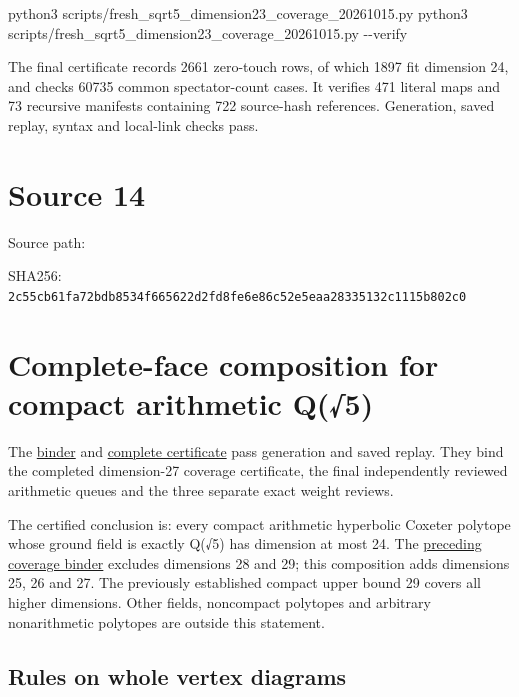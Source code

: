 \documentclass[
  10pt,
]{report}
\newenvironment{Shaded}{}{}
\newcommand{\AttributeTok}[1]{\textcolor[rgb]{0.49,0.56,0.16}{#1}}
\newcommand{\ExtensionTok}[1]{#1}
\newcommand{\NormalTok}[1]{#1}
\begin{document}
\begin{Shaded}
\begin{Highlighting}[]
\ExtensionTok{python3}\NormalTok{ scripts/fresh\_sqrt5\_dimension23\_coverage\_20261015.py}
\ExtensionTok{python3}\NormalTok{ scripts/fresh\_sqrt5\_dimension23\_coverage\_20261015.py }\AttributeTok{{-}{-}verify}
\end{Highlighting}
\end{Shaded}

The final certificate records 2661 zero-touch rows, of which 1897 fit
dimension 24, and checks 60735 common spectator-count cases. It verifies
471 literal maps and 73 recursive manifests containing 722 source-hash
references. Generation, saved replay, syntax and local-link checks pass.

\clearpage

\chapter{Source 14}\label{source-14}

Source path: 

SHA256:
\nolinkurl{2c55cb61fa72bdb8534f665622d2fd8fe6e86c52e5eaa28335132c1115b802c0}

\chapter{Complete-face composition for compact arithmetic
Q(√5)}\label{complete-face-composition-for-compact-arithmetic-q5}

The
\href{../scripts/fresh_sqrt5_dimension24_coverage_20261015.py}{binder}
and \href{fresh_sqrt5_dimension24_coverage_20261015.json}{complete
certificate} pass generation and saved replay. They bind the completed
dimension-27 coverage certificate, the final independently reviewed
arithmetic queues and the three separate exact weight reviews.

The certified conclusion is: every compact arithmetic hyperbolic Coxeter
polytope whose ground field is exactly Q(√5) has dimension at most 24.
The \href{fresh_sqrt5_dimension27_coverage_20261015.md}{preceding
coverage binder} excludes dimensions 28 and 29; this composition adds
dimensions 25, 26 and 27. The previously established compact upper bound
29 covers all higher dimensions. Other fields, noncompact polytopes and
arbitrary nonarithmetic polytopes are outside this statement.

\section{Rules on whole vertex
diagrams}\label{rules-on-whole-vertex-diagrams}
\end{document}
